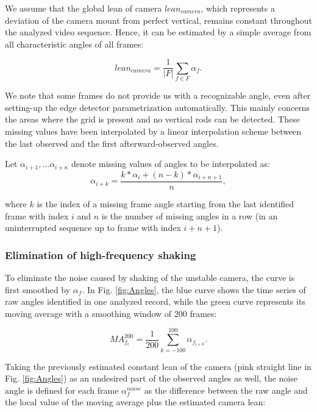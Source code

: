 \documentclass[preprint,12pt]{elsarticle}
\begin{document}
We assume that the global lean of camera $lean_{camera}$, which represents a deviation of the camera mount from perfect vertical, remains constant throughout the analyzed video sequence. Hence, it can be estimated by a simple average from all characteristic angles of all frames:

\begin{equation}
lean_{camera} = \frac{1}{|F|}\sum_{f \in F} \alpha_f.
\end{equation}

We note that some frames do not provide us with a recognizable angle, even after setting-up the edge detector parametrization automatically. This mainly concerns the areas where the grid is present and no vertical rods can be detected. These missing values have been interpolated by a linear interpolation scheme between the last observed and the first afterward-observed angles.

Let $\alpha_{i+1}, ... \alpha_{i+n}$ denote missing values of angles to be interpolated as:
\begin{equation}
    \alpha_{i+k} = \frac{k * \alpha_{i} + (n - k) * \alpha_{i + n + 1}}{n},
\end{equation}

where $k$ is the index of a missing frame angle starting from the last identified frame with index $i$ and $n$ is the number of missing angles in a row (in an uninterrupted sequence up to frame with index $i+n+1$).

\subsubsection{Elimination of high-frequency shaking}

To eliminate the noise caused by shaking of the unstable camera, the curve is first smoothed by $\alpha_f$. In Fig. \ref{fig:Angles}, the blue curve shows the time series of raw angles identified in one analyzed record, while the green curve represents its moving average with a smoothing window of 200 frames: 

\begin{equation}
    MA_{f_i}^{200} = \frac{1}{200}\sum_{k=-100}^{100}\alpha_{f_{i+k}}.
\end{equation}

Taking the previously estimated constant lean of the camera (pink straight line in Fig. \ref{fig:Angles}) as an undesired part of the observed angles as well, the noise angle is defined for each frame $\alpha_f^{noise}$ as the difference between the raw angle and the local value of the moving average plus the estimated camera lean: 
\end{document}
